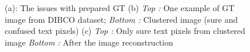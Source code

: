 \documentclass[runningheads]{llncs}
\begin{document}
\begin{figure}[bht!]
\begin{subfigure}[b]{0.32\linewidth}
		\centering {}
		\caption{}
		\label{image_text_17}
	\end{subfigure}	       
	\caption[dibcoProbs]{(a): The issues with prepared GT (b) \textit{Top :} One example of GT image from DIBCO dataset; \textit{Bottom :} Clustered image (sure and confused text pixels) (c) \textit{Top :} Only sure text pixels from clustered image \textit{Bottom :} After the image reconstruction}
	\label{fig:dibcoProbsl}
\end{figure}
\end{document}
